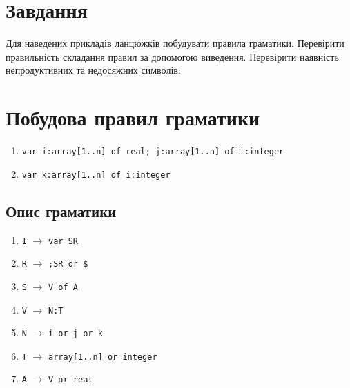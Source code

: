 \section{Завдання}
Для наведених прикладів ланцюжків побудувати правила граматики.
Перевірити правильність складання правил за допомогою виведення.
Перевірити наявність непродуктивних та недосяжних символів:


\section{Побудова правил граматики}
\begin{enumerate}
    \item \verb|var i:array[1..n] of real; j:array[1..n] of i:integer|
    \item \verb|var k:array[1..n] of i:integer|
\end{enumerate}

\subsection{Опис граматики}


\begin{enumerate}
    \item  \verb|I| $\to$ \verb|var SR|
    \item  \verb|R| $\to$ \verb|;SR or $|
    \item  \verb|S| $\to$ \verb|V of A|
    \item  \verb|V| $\to$ \verb|N:T|
    \item  \verb|N| $\to$ \verb|i or j or k|
    \item  \verb|T| $\to$ \verb|array[1..n] or integer|
    \item  \verb|A| $\to$ \verb|V or real|
\end{enumerate}

\newpage

